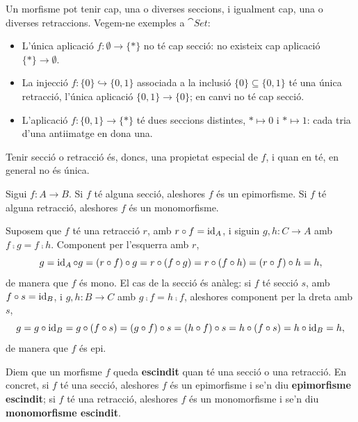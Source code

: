 Un morfisme pot tenir cap, una o diverses seccions, i igualment cap, una o diverses retraccions. Vegem-ne exemples a $\cat{Set}$:
\begin{itemize}
\item L'única aplicació $f\colon\emptyset\to\{*\}$ no té cap secció: no existeix cap aplicació $\{*\}\to\emptyset$.
\item La injecció $f\colon\{0\}\hookrightarrow\{0,1\}$ associada a la inclusió $\{0\}\subseteq\{0,1\}$ té una única retracció, l'única aplicació $\{0,1\}\to\{0\}$; en canvi no té cap secció.
\item L'aplicació $f\colon\{0,1\}\to\{*\}$ té dues seccions distintes, $*\mapsto 0$ i $*\mapsto 1$: cada tria d'una antiimatge en dona una.
\end{itemize}
Tenir secció o retracció és, doncs, una propietat especial de $f$, i quan en té, en general no és única.

\begin{proposicio}\label{prop:escindit-mono-epi}
Sigui $f\colon A\to B$. Si $f$ té alguna secció, aleshores $f$ és un epimorfisme. Si $f$ té alguna retracció, aleshores $f$ és un monomorfisme.
\end{proposicio}

\begin{prova}
Suposem que $f$ té una retracció $r$, amb $r\circ f=\operatorname{id}_A$, i siguin $g,h\colon C\to A$ amb $f\comp g=f\comp h$. Component per l'esquerra amb $r$,
\[
g=\operatorname{id}_A\circ g=(r\circ f)\circ g=r\circ(f\circ g)=r\circ(f\circ h)=(r\circ f)\circ h=h,
\]
de manera que $f$ és mono. El cas de la secció és anàleg: si $f$ té secció $s$, amb $f\circ s=\operatorname{id}_B$, i $g,h\colon B\to C$ amb $g\comp f=h\comp f$, aleshores component per la dreta amb $s$,
\[
g=g\circ\operatorname{id}_B=g\circ(f\circ s)=(g\circ f)\circ s=(h\circ f)\circ s=h\circ(f\circ s)=h\circ\operatorname{id}_B=h,
\]
de manera que $f$ és epi.
\end{prova}

\begin{definicio}
Diem que un morfisme $f$ queda \textbf{escindit} quan té una secció o una retracció. En concret, si $f$ té una secció, aleshores $f$ és un epimorfisme i se'n diu \textbf{epimorfisme escindit}; si $f$ té una retracció, aleshores $f$ és un monomorfisme i se'n diu \textbf{monomorfisme escindit}.
\end{definicio}

